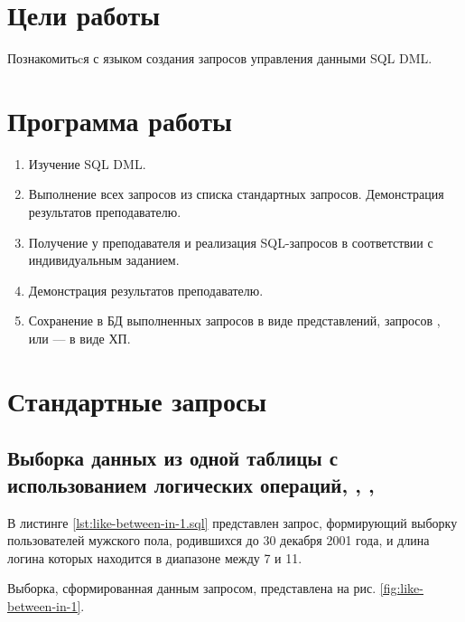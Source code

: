 





\tableofcontents
\newpage

\section{Цели работы}

Познакомитьcя с языком создания запросов управления данными SQL DML. 

\section{Программа работы}

\begin{enumerate}
	\item Изучение SQL DML.
	\item Выполнение всех запросов из списка стандартных запросов. Демонстрация результатов преподавателю.
	\item Получение у преподавателя и реализация SQL-запросов в соответствии с индивидуальным заданием. 			\item Демонстрация результатов преподавателю.
	\item Сохранение в БД выполненных запросов  в виде представлений, запросов ,  или  --- в виде ХП.
 
\end{enumerate}
 
\section{Стандартные запросы} 

\subsection{Выборка данных из одной таблицы с использованием логических операций, , , }

В листинге \ref{lst:like-between-in-1.sql} представлен запрос, формирующий выборку пользователей мужского пола, родившихся до 30 декабря 2001 года, и длина логина которых находится в диапазоне между 7 и 11.


 
Выборка, сформированная данным запросом, представлена на рис. \ref{fig:like-between-in-1}.

